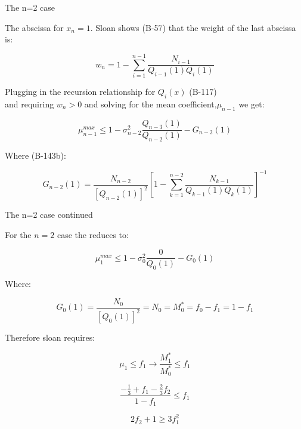 \documentclass{beamer}
\begin{document}
\begin{frame}{The n=2 case}

The abscissa for $x_n = 1$. Sloan shows (B-57) that the weight of the last 
abscissa is:

$$w_n = 1 - \sum_{i=1}^{n-1}\frac{N_{i-1}}{Q_{i-1}(1)Q_i(1)}$$

Plugging in the recursion relationship for $Q_i(x)$ (B-117) \\
and requiring $w_n>0$ and solving for the mean coefficient,$\mu_{n-1}$ we get:

$$\mu^{max}_{n-1} \leq 1 - \sigma^2_{n-2}\frac{Q_{n-3}(1)}{Q_{n-2}(1)} - G_{n-2}(1)$$

Where (B-143b):

$$G_{n-2}(1) = \frac{N_{n-2}}{[Q_{n-2}(1)]^2}\left[ 1 -\sum_{k=1}^{n-2} 
                \frac{N_{k-1}}{Q_{k-1}(1)Q_{k}(1)}\right]^{-1}$$


\end{frame}

\begin{frame}{The n=2 case continued}

For the $n=2$ case the reduces to:

$$\mu^{max}_1 \leq 1 - \sigma^2_{0}\frac{0}{Q_{0}(1)} - G_{0}(1)$$

Where:

$$G_{0}(1) = \frac{N_{0}}{[Q_{0}(1)]^2} = N_{0} = M^*_0 = f_0 - f_1 = 1 - f_1$$

Therefore sloan requires:

$$\mu_1 \leq f_1 \rightarrow \frac{M^*_1}{M^*_0}\leq f_1$$

$$\frac{-\frac{1}{3} + f_1 - \frac{2}{3} f_2}{1 - f_1}\leq f_1$$

$$2f_2 + 1\geq 3f_1^2$$


\end{frame}
\end{document}

